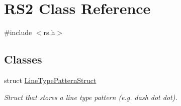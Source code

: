 \hypertarget{classRS2}{\section{R\-S2 Class Reference}
\label{classRS2}
}


{\ttfamily \#include $<$rs.\-h$>$}

\subsection*{Classes}
\begin{DoxyCompactItemize}
\item 
struct \hyperlink{structRS2_1_1LineTypePatternStruct}{Line\-Type\-Pattern\-Struct}
\begin{DoxyCompactList}\small\item\em Struct that stores a line type pattern (e.\-g. dash dot dot). \end{DoxyCompactList}\end{DoxyCompactItemize}
